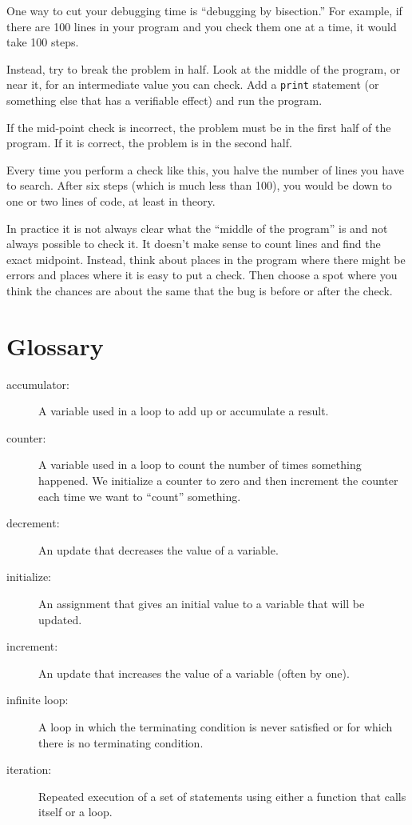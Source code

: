 One way to cut your debugging time is ``debugging by bisection.''
For example, if there are 100 lines in your program and you
check them one at a time, it would take 100 steps.

Instead, try to break the problem in half.  Look at the middle
of the program, or near it, for an intermediate value you
can check.  Add a {\tt print} statement (or something else
that has a verifiable effect) and run the program.

If the mid-point check is incorrect, the problem must be in the
first half of the program.  If it is correct, the problem is
in the second half.

Every time you perform a check like this, you halve the number
of lines you have to search.  After six steps (which is much
less than 100), you would be down to one or two lines of code,
at least in theory.

In practice it is not always clear what
the ``middle of the program'' is and not always possible to
check it.  It doesn't make sense to count lines and find the
exact midpoint.  Instead, think about places
in the program where there might be errors and places where it
is easy to put a check.  Then choose a spot where you
think the chances are about the same that the bug is before
or after the check.

\section{Glossary}

\begin{description}

\item[accumulator:] A variable used in a loop to add up or
accumulate a result.

\item[counter:] A variable used in a loop to count the number
of times something happened.  We initialize a counter to 
zero and then increment the counter each time we want to
``count'' something.

\item[decrement:] An update that decreases the value of a variable.

\item[initialize:] An assignment that gives an initial value to
a variable that will be updated.

\item[increment:] An update that increases the value of a variable
(often by one).

\item[infinite loop:] A loop in which the terminating condition is
never satisfied or for which there is no terminating condition.

\item[iteration:] Repeated execution of a set of statements using
either a function that calls itself or a loop.

\end{description}


